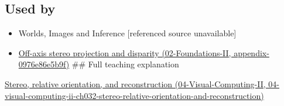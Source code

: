 \subsection{Used by}\label{appendix-c4e98b6e4001-used-by}

\begin{itemize}
\item
  {Worlds, Images and Inference {[}referenced source unavailable{]}}
\item
  \href{../02-Foundations-II/main.pdf\#nameddest=appendix-0976e86e5b9f}{Off-axis stereo projection and disparity (02-Foundations-II, appendix-0976e86e5b9f)} \#\# Full teaching explanation
\end{itemize}

\href{../04-Visual-Computing-II/main.pdf\#nameddest=04-visual-computing-ii-ch032-stereo-relative-orientation-and-reconstruction}{Stereo, relative orientation, and reconstruction (04-Visual-Computing-II, 04-visual-computing-ii-ch032-stereo-relative-orientation-and-reconstruction)}
